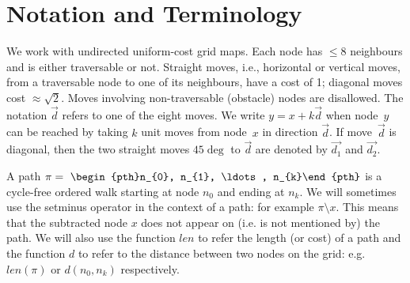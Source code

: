 \section{Notation and Terminology}
\label{sec:notation}
We work with undirected uniform-cost grid maps.
Each node has $\leq 8$ neighbours and is either traversable or not. 
Straight moves, i.e., horizontal or vertical moves, 
from a traversable node to one of its neighbours, 
have a cost of 1; diagonal moves cost $\approx\sqrt 2$.
Moves involving non-traversable (obstacle) nodes are disallowed.
The notation $\vec{d}$ refers to one of the eight moves.  
We write $y = x + k\vec{d}$ when node~$y$ can be reached 
by taking $k$ unit moves from node~$x$ in direction $\vec{d}$.
If move~$\vec{d}$ is diagonal, 
then the two straight moves $45\deg$ to $\vec{d}$ are denoted by $\vec{d_1}$ and $\vec{d_2}$.  

A path $\pi =~\begin{pth}n_{0}, n_{1}, \ldots , n_{k}\end{pth}$ is a
cycle-free ordered walk starting at node $n_{0}$ and ending at 
$n_{k}$.
We will sometimes use the setminus operator in the context of a path:
for example $\pi \setminus x$. This means that the subtracted node $x$
does not appear on (i.e. is not mentioned by) the path. 
We will also use the function $len$ to refer the length (or cost) of a path 
and the function $d$ to refer to the distance between two nodes 
on the grid: e.g. $len(\pi)$ or $d(n_{0}, n_{k})$ respectively.



